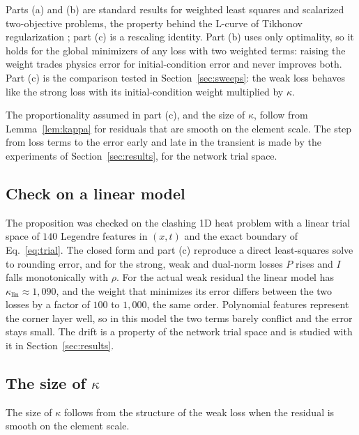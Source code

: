 \documentclass[a4paper,fleqn]{cas-sc}
\begin{document}
Parts (a) and (b) are standard results for weighted least squares and scalarized two-objective problems, the
property behind the L-curve of Tikhonov regularization \cite{hansen1992,boyd2004}; part (c) is a rescaling identity.
Part (b) uses only optimality, so it holds for the global minimizers of any loss with two weighted terms: raising the
weight trades physics error for initial-condition error and never improves both. Part (c) is the comparison tested in
Section~\ref{sec:sweeps}: the weak loss behaves like the strong loss with its initial-condition weight multiplied by
$\kappa$.

\begin{remark}
\label{rem:limits}
The proportionality assumed in part (c), and the size of $\kappa$, follow from Lemma~\ref{lem:kappa} for residuals that
are smooth on the element scale. The step from loss terms to the error early and late in the transient is made by the
experiments of Section~\ref{sec:results}, for the network trial space.
\end{remark}

\subsection{Check on a linear model}
\label{sec:lincheck}

The proposition was checked on the clashing 1D heat problem with a linear trial space of $140$ Legendre features in
$(x,t)$ and the exact boundary of Eq.~\eqref{eq:trial}.
The closed form and part (c) reproduce a direct least-squares solve to rounding error, and for the strong, weak and
dual-norm losses $P$ rises and $I$ falls monotonically with $\rho$. For the actual weak residual the linear model has
$\kappa_{\mathrm{lin}}\approx1{,}090$, and the weight that minimizes its error differs between the two losses by a factor
of $100$ to $1{,}000$, the same order. Polynomial features represent the corner layer well, so in this model the two
terms barely conflict and the error stays small. The drift is a property of the network trial space and is studied
with it in Section~\ref{sec:results}.

\subsection{The size of $\kappa$}
\label{sec:kappascaling}

The size of $\kappa$ follows from the structure of the weak loss when the residual is smooth on the element scale.
\end{document}
